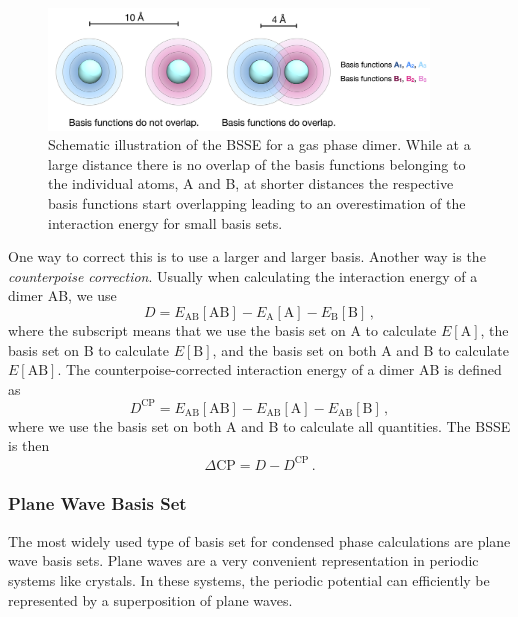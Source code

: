 \documentclass{article}
\theoremstyle{plain}\theoremheaderfont{\normalfont\itshape}\theorembodyfont{\rmfamily}\theoremseparator{.}\newtheorem*{rem}{Remark}\newtheorem*{ex}{Example}\newtheorem*{proof}{Proof}\newtheorem*{altp}{Alternative proof}
\theoremstyle{plain}\theoremheaderfont{\normalfont\bfseries}\theorembodyfont{\rmfamily}\theoremseparator{.}\newtheorem{thm}{Theorem}[section]\newtheorem{lem}[thm]{Lemma}\newtheorem{prop}[thm]{Proposition}\newtheorem*{cor}{Corollary}\newtheorem{defn}[thm]{Definition}\newtheorem{clm}[thm]{Claim}\newtheorem{clminproof}{Claim}\newtheorem{pos}{Postulate}[section]
\theoremstyle{break}\theoremheaderfont{\normalfont\itshape}\theorembodyfont{\rmfamily}\theoremseparator{.\medskip}\newtheorem*{proofskip}{Proof}\newtheorem*{exs}{Examples}\newtheorem*{rems}{Remarks}
\theoremstyle{break}\theoremheaderfont{\normalfont\bfseries}\theorembodyfont{\rmfamily}\theoremseparator{.\medskip}\newtheorem{lemskip}[thm]{Lemma}\newtheorem{defnskip}[thm]{Definition}\newtheorem{propskip}[thm]{Proposition}\newtheorem{thmskip}[thm]{Theorem}
\numberwithin{equation}{section}
\begin{document}
    \begin{figure}
        \centering
        \includegraphics[width=0.9\textwidth]{BSSE.png}
        \caption{Schematic illustration of the BSSE for a gas phase dimer. While at a large distance there is no overlap of the basis functions belonging to the individual atoms, A and B, at shorter distances the respective basis functions start overlapping leading to an overestimation of the interaction energy for small basis sets.}
        \label{Fig:BSSE}
    \end{figure}

    One way to correct this is to use a larger and larger basis. Another way is the \textit{counterpoise correction}. Usually when calculating the interaction energy of a dimer AB, we use
    \begin{equation}
        D=E_{\mathrm{AB}}[\mathrm{AB}]-E_{\mathrm{A}}[\mathrm{A}]-E_{\mathrm{B}}[\mathrm{B}]\,,
    \end{equation}
    where the subscript means that we use the basis set on A to calculate \(E[\mathrm{A}]\), the basis set on B to calculate \(E[\mathrm{B}]\), and the basis set on both A and B to calculate \(E[\mathrm{AB}]\). The counterpoise-corrected interaction energy of a dimer AB is defined as
    \begin{equation}
        D^{\text{CP}}=E_{\mathrm{AB}}[\mathrm{AB}]-E_{\mathrm{AB}}[\mathrm{A}]-E_{\mathrm{AB}}[\mathrm{B}]\,,
    \end{equation}
    where we use the basis set on both A and B to calculate all quantities. The BSSE is then
    \begin{equation}
        \Delta\text{CP}=D-D^{\text{CP}}\,.
    \end{equation}

    \subsubsection{Plane Wave Basis Set}
    The most widely used type of basis set for condensed phase calculations are plane wave basis sets. Plane waves are a very convenient representation in periodic systems like crystals. In these systems, the periodic potential can efficiently be represented by a superposition of plane waves.
\end{document}
